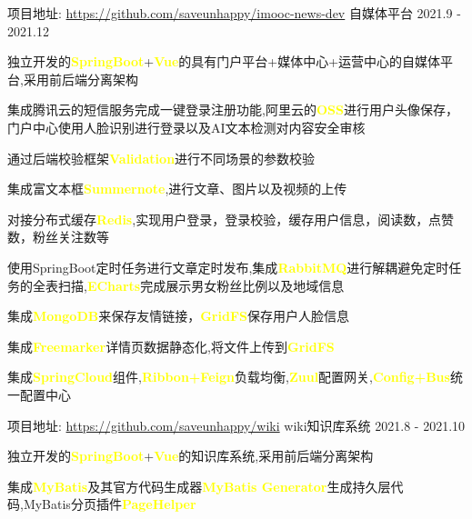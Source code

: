 \begin{cventries}
	\cventry
	{项目地址: \url{https://github.com/saveunhappy/imooc-news-dev}} %
	{自媒体平台} %
	{} %
	{2021.9 - 2021.12} %
	{
		\begin{cvitems} %
			\item {独立开发的\textcolor{yellow}{\textbf{SpringBoot}}+\textcolor{yellow}{\textbf{Vue}}的具有门户平台+媒体中心+运营中心的自媒体平台,采用前后端分离架构}
			\item {集成腾讯云的短信服务完成一键登录注册功能,阿里云的\textcolor{yellow}{\textbf{OSS}}}进行用户头像保存，门户中心使用人脸识别进行登录以及AI文本检测对内容安全审核
			\item {通过后端校验框架\textcolor{yellow}{\textbf{Validation}}进行不同场景的参数校验}
			\item {集成富文本框\textcolor{yellow}{\textbf{Summernote}},进行文章、图片以及视频的上传}
			\item {对接分布式缓存\textcolor{yellow}{\textbf{Redis}},实现用户登录，登录校验，缓存用户信息，阅读数，点赞数，粉丝关注数等}
			\item {使用SpringBoot定时任务进行文章定时发布,集成\textcolor{yellow}{\textbf{RabbitMQ}}进行解耦避免定时任务的全表扫描,\textcolor{yellow}{\textbf{ECharts}}完成展示男女粉丝比例以及地域信息}	
			\item {集成\textcolor{yellow}{\textbf{MongoDB}}来保存友情链接，\textcolor{yellow}{\textbf{GridFS}}保存用户人脸信息}
			\item {集成\textcolor{yellow}{\textbf{Freemarker}}详情页数据静态化,将文件上传到\textcolor{yellow}{\textbf{GridFS}}}
			\item
			{集成\textcolor{yellow}{\textbf{SpringCloud}}组件,\textcolor{yellow}{\textbf{Ribbon+Feign}}负载均衡,\textcolor{yellow}{\textbf{Zuul}}配置网关,\textcolor{yellow}{\textbf{Config+Bus}}统一配置中心}
		\end{cvitems}
	} 
	\cventry
    {项目地址: \url{https://github.com/saveunhappy/wiki}} %
    {wiki知识库系统} %
    {} %
    {2021.8 - 2021.10} %
    {
	    \begin{cvitems} %
		\item {独立开发的\textcolor{yellow}{\textbf{SpringBoot}}+\textcolor{yellow}{\textbf{Vue}}的知识库系统,采用前后端分离架构}
		\item {集成\textcolor{yellow}{\textbf{MyBatis}}及其官方代码生成器\textcolor{yellow}{\textbf{MyBatis Generator}}生成持久层代码,MyBatis分页插件\textcolor{yellow}{\textbf{PageHelper}}}

\end{cvitems}}
\end{cventries}
